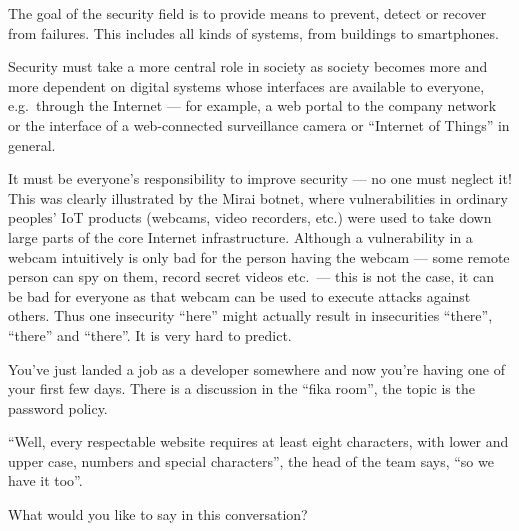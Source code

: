 \begin{solution}
The goal of the security field is to provide means to prevent, detect or recover 
from failures.
This includes all kinds of systems, from buildings to smartphones.

Security must take a more central role in society as society becomes more and 
more dependent on digital systems whose interfaces are available to everyone, 
e.g.\ through the Internet --- for example, a web portal to the company network 
or the interface of a web-connected surveillance camera or \enquote{Internet of 
Things} in general.

It must be everyone's responsibility to improve security --- no one must neglect 
it!
This was clearly illustrated by the Mirai botnet, where vulnerabilities in 
ordinary peoples' IoT products (webcams, video recorders, etc.) were used to 
take down large parts of the core Internet infrastructure.
Although a vulnerability in a webcam intuitively is only bad for the person 
having the webcam --- some remote person can spy on them, record secret videos 
etc.\ --- this is not the case, it can be bad for everyone as that webcam can be 
used to execute attacks against others.
Thus one insecurity \enquote{here} might actually result in insecurities 
\enquote{there}, \enquote{there} and \enquote{there}.
It is very hard to predict.
\end{solution}
 
\question[3]
You've just landed a job as a developer somewhere and now you're having one of 
your first few days.
There is a discussion in the \enquote{fika room}, the topic is the password 
policy.

\enquote{Well, every respectable website requires at least eight characters, 
  with lower and upper case, numbers and special characters}, the head of the 
team says, \enquote{so we have it too}.

What would you like to say in this conversation?

